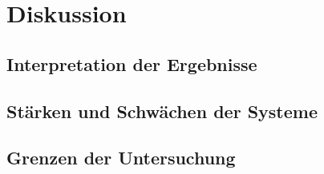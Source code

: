 %

\chapter{Diskussion}
\label{sec:discussion}

\section{Interpretation der Ergebnisse}
\label{sec:discussion:interpretation}

\section{Stärken und Schwächen der Systeme}
\label{sec:discussion:strengths-weaknesses}

\section{Grenzen der Untersuchung}
\label{sec:discussion:limits}